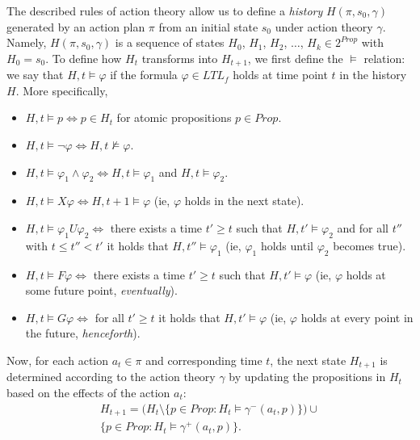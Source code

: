 \documentclass[a4paper,fleqn]{cas-dc}
\begin{document}
The described rules of action theory allow us to define a {\it history} $H(\pi, s_0, \gamma)$
generated by an action plan $\pi$ from an initial state $s_0$
under action theory $\gamma$. Namely, $H(\pi, s_0, \gamma)$
is a sequence of states $H_0$, $H_1$, $H_2$, $\dots$, $H_k\in 2^{Prop}$ with $H_0=s_0$. To define how $H_t$ transforms
into $H_{t+1}$, we first define the $\models$ relation: we say that $H, t \models \varphi$ if the formula \( \varphi\in LTL_f \) holds at time point $t$ in the history \( H \). More specifically,
\begin{itemize}
    \item \( H, t \models p \iff p \in H_{t} \)  for atomic propositions $p\in Prop$.
    \item \( H, t \models \neg \varphi \iff H, t \not\models \varphi \).
    \item \( H, t \models \varphi_1 \land \varphi_2 \iff H, t \models \varphi_1 \) and \( H, t \models \varphi_2 \).
    \item \( H, t \models X \varphi \iff H, t+1 \models \varphi \) (ie, \( \varphi \) holds in the next state).
    \item \( H, t \models \varphi_1 U \varphi_2 \iff \) there exists a time \( t' \geq t \) such that \( H, t' \models \varphi_2 \) and for all \( t'' \) with \( t \leq t'' < t' \) it holds that \( H, t'' \models \varphi_1 \) (ie, \( \varphi_1 \) holds until \( \varphi_2 \) becomes true).
    \item \( H, t \models F \varphi \iff \) there exists a time \( t' \geq t \) such that \( H, t' \models \varphi \) (ie, \( \varphi \) holds at some future point, {\it eventually}).
    \item \( H, t \models G \varphi \iff \) for all \( t' \geq t \) it holds that \( H, t' \models \varphi \) (ie, \( \varphi \) holds at every point in the future, {\it henceforth}). %
\end{itemize}

Now, for each action \( a_t \in \pi \) and corresponding time \( t \), the next state \( H_{t+1} \) is determined according to the action theory \( \gamma \) by updating the propositions in \( H_t \) based on the effects of the action \( a_t \):
\begin{equation}\label{h}
\begin{aligned}
H_{t+1} = \bigg( H_{t} \setminus \{ p \in \mathit{Prop} : H_{t} \models \gamma^-(a_t, p) \} \bigg) \cup \\ \{ p \in \mathit{Prop} : H_{t} \models \gamma^+(a_t, p) \}.
\end{aligned}
\end{equation}
\end{document}
